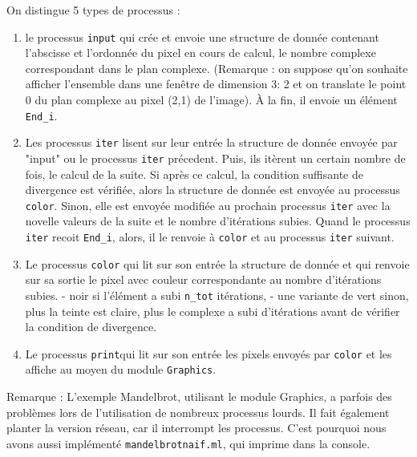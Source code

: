 \documentclass[11pt,a4paper]{article}
\renewcommand{\tt}[1]{\texttt{#1}}
\begin{document}
On distingue 5 types de processus :
\begin{enumerate}

\item le processus \tt{input} qui crée et envoie une structure de donnée
   contenant l'abscisse et l'ordonnée du pixel en cours de calcul, le
   nombre complexe correspondant dans le plan complexe. (Remarque : on
   suppose qu'on souhaite afficher l'ensemble dans une fenêtre de
   dimension 3: 2 et on translate le point 0 du plan complexe au pixel  
   (2,1) de l'image).
   À la fin, il envoie un élément \tt{End\_i}.

\item Les processus \tt{iter} lisent sur leur entrée la structure de donnée
   envoyée par "input" ou le processus \tt{iter} précedent. Puis, ils
   itèrent un certain nombre de fois, le calcul de la suite. Si après ce
   calcul, la condition suffisante de divergence est vérifiée, alors la
   structure de donnée  est
   envoyée au processus \tt{color}. Sinon, elle est envoyée modifiée  au 
   prochain processus \tt{iter} avec la novelle valeurs de la suite et le
   nombre d'itérations \og subies\fg .
   Quand le processus \tt{iter} recoit \tt{End\_i}, alors, il le renvoie
   à \tt{color} et au processus \tt{iter} suivant. 

\item Le processus \tt{color} qui lit sur son entrée la structure de donnée et
   qui renvoie sur sa sortie le pixel avec couleur correspondante au
   nombre d'itérations subies.
   - noir si l'élément a subi \tt{n\_tot} itérations,
   - une variante de vert sinon, plus la teinte est claire, plus le
	 complexe a subi d'itérations avant de vérifier la condition de
	 divergence.


\item Le processus \tt{print}qui lit sur son entrée les pixels envoyés par
	\tt{color} et les affiche au moyen du module \tt{Graphics}.
	

\end{enumerate}

Remarque : 
	L'exemple Mandelbrot, utilisant le module Graphics, a parfois des problèmes lors de l'utilisation de nombreux processus lourds. Il fait également planter la version réseau, car il interrompt les processus. C'est pourquoi nous avons aussi implémenté \tt{mandelbrotnaif.ml}, qui imprime dans la console.
\end{document}
